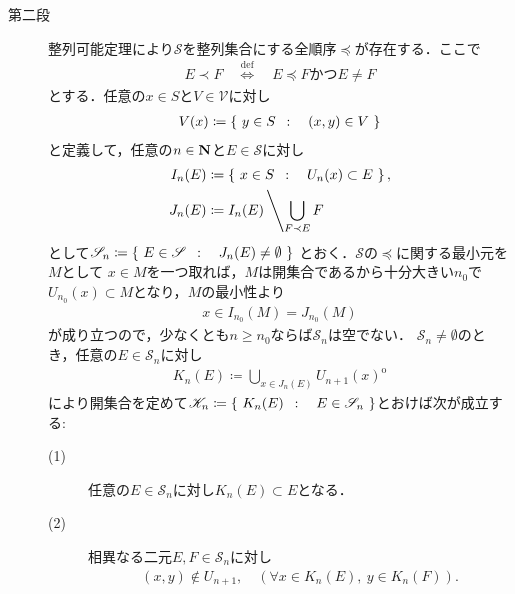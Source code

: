 \begin{prf}
\begin{description}
			\item[第二段]
				整列可能定理により$\mathscr{S}$を整列集合にする全順序$\preceq$が存在する．ここで
				\begin{align}
					E \prec F \quad \overset{\mathrm{def}}{\Longleftrightarrow} \quad
					\mbox{$E \preceq F$かつ$E \neq F$}
				\end{align}
				とする．任意の$x \in S$と$V \in \mathscr{V}$に対し
				\begin{align}
					V(x) \coloneqq \left\{\ y \in S\ \, : \quad (x,y) \in V\ \right\}
				\end{align}
				と定義して，任意の$n \in \mathbf{N}$と$E \in \mathscr{S}$に対し
				\begin{align}
					I_n(E) &\coloneqq \left\{\ x \in S\ \, : \quad U_n(x) \subset E\ \right\}, \\
					J_n(E) &\coloneqq I_n(E) \left\backslash \bigcup_{F \prec E}F \right.
				\end{align}
				として$\mathscr{S}_n \coloneqq \left\{\ E \in \mathscr{S}\ \, : \quad J_n(E) \neq \emptyset\ \right\}$
				とおく．$\mathscr{S}$の$\preceq$に関する最小元を$M$として
				$x \in M$を一つ取れば，$M$は開集合であるから十分大きい$n_0$で
				$U_{n_0}(x) \subset M$となり，$M$の最小性より
				\begin{align}
					x \in I_{n_0}(M) = J_{n_0}(M)
				\end{align}
				が成り立つので，少なくとも$n \geq n_0$ならば$\mathscr{S}_n$は空でない．
				$\mathscr{S}_n \neq \emptyset$のとき，任意の$E \in \mathscr{S}_n$に対し
				\begin{align}
					K_n(E) \coloneqq \bigcup_{x \in J_n(E)} U_{n+1}(x)^{\mathrm{o}}
				\end{align}
				により開集合を定めて$\mathscr{K}_n \coloneqq 
				\left\{\ K_n(E)\ \, : \quad E \in \mathscr{S}_n\ \right\}$とおけば次が成立する:
				\begin{description}
					\item[(1)] 任意の$E \in \mathscr{S}_n$に対し$K_n(E) \subset E$となる．
					
					\item[(2)] 相異なる二元$E, F \in \mathscr{S}_n$に対し
						\begin{align}
							(x,y) \notin U_{n+1},\quad
							(\forall x \in K_n(E),\ y \in K_n(F)).
						\end{align}
						

\end{description}
\end{description}
\end{prf}
